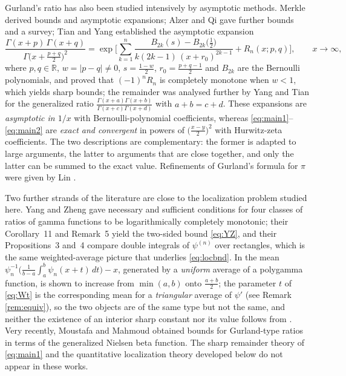 \documentclass[11pt,a4paper]{amsart}
\theoremstyle{definition}
\newcommand{\R}{\mathbb{R}}
\begin{document}
Gurland's ratio has also been studied intensively by asymptotic methods. Merkle
\cite{Merkle05} derived bounds and asymptotic expansions; Alzer \cite{Alzer97} and Qi
\cite{Qi10} gave further bounds and a survey; Tian and Yang \cite{TianYang21} established
the asymptotic expansion
\[
  \frac{\Gamma(x+p)\,\Gamma(x+q)}{\Gamma\big(x+\frac{p+q}{2}\big)^{2}}
   =\exp\Big[\sum_{k=1}^{n}\frac{B_{2k}(s)-B_{2k}\big(\frac12\big)}
   {k(2k-1)\,(x+r_{0})^{2k-1}}+R_{n}(x;p,q)\Big],\qquad x\to\infty ,
\]
where $p,q\in\R$, $w=|p-q|\ne0$, $s=\frac{1-w}{2}$, $r_{0}=\frac{p+q-1}{2}$ and $B_{2k}$
are the Bernoulli polynomials, and proved that $(-1)^{n}R_{n}$ is completely monotone when
$w<1$, which yields sharp bounds; the remainder was analysed further by Yang and Tian
\cite{YangTian24} for the generalized ratio
$\frac{\Gamma(x+a)\Gamma(x+b)}{\Gamma(x+c)\Gamma(x+d)}$ with $a+b=c+d$. These expansions
are \emph{asymptotic in $1/x$} with Bernoulli-polynomial coefficients, whereas
\eqref{eq:main1}--\eqref{eq:main2} are \emph{exact and convergent} in powers of
$\big(\frac{x-y}{2}\big)^{2}$ with Hurwitz-zeta coefficients. The two descriptions are
complementary: the former is adapted to large arguments, the latter to arguments that are
close together, and only the latter can be summed to the exact value. Refinements of
Gurland's formula for $\pi$ were given by Lin \cite{Lin13}.

Two further strands of the literature are close to the localization problem studied here.
Yang and Zheng \cite{YangZheng19} gave necessary and sufficient conditions for four classes
of ratios of gamma functions to be logarithmically completely monotonic; their
Corollary~11 and Remark~5 yield the two-sided bound \eqref{eq:YZ}, and their
Propositions~3 and~4 compare double integrals of $\psi^{(n)}$ over rectangles, which is the
same weighted-average picture that underlies \eqref{eq:locbnd}. In \cite{YangZheng16} the
mean $\psi_{n}^{-1}\big(\frac{1}{b-a}\int_{a}^{b}\psi_{n}(x+t)\,dt\big)-x$, generated by a
\emph{uniform} average of a polygamma function, is shown to increase from $\min(a,b)$ onto
$\frac{a+b}{2}$; the parameter $t$ of \eqref{eq:Wt} is the corresponding mean for a
\emph{triangular} average of $\psi'$ (see Remark \ref{rem:equiv}), so the two objects are of
the same type but not the same, and neither the existence of an interior sharp constant nor
its value follows from \cite{YangZheng16}. Very recently, Moustafa and Mahmoud
\cite{MoustafaMahmoud26} obtained bounds for Gurland-type ratios in terms of the generalized
Nielsen beta function. The sharp remainder theory of \eqref{eq:main1} and the quantitative
localization theory developed below do not appear in these works.
\end{document}

